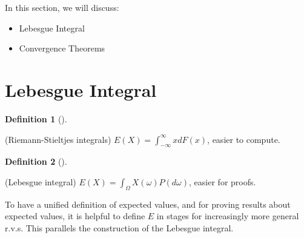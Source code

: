 \documentclass[
  letterpaper,
  DIV=11,
  numbers=noendperiod]{scrreprt}
\providecommand{\tightlist}{%
  \setlength{\itemsep}{0pt}\setlength{\parskip}{0pt}}\usepackage{longtable,booktabs,array}
\theoremstyle{definition}
\newtheorem{definition}{Definition}[chapter]
\theoremstyle{plain}
\theoremstyle{remark}
\begin{document}

In this section, we will discuss:

\begin{itemize}
\tightlist
\item
  Lebesgue Integral
\item
  Convergence Theorems
\end{itemize}

\hypertarget{lebesgue-integral}{%
\section*{Lebesgue Integral}\label{lebesgue-integral}}


\leavevmode{}%
\begin{definition}[]\label{def-Riemann-Stieltjes-integral}

(Riemann-Stieltjes integrals)
\(E(X) = \int_{-\infty}^{\infty} x dF(x)\), easier to compute.

\end{definition}

\leavevmode{}%
\begin{definition}[]\label{def-Lebesgue-integral}

(Lebesgue integral) \(E(X) = \int_{\Omega} X(\omega) P(d\omega)\),
easier for proofs.

\end{definition}

To have a unified definition of expected values, and for proving results
about expected values, it is helpful to define \(E\) in stages for
increasingly more general r.v.s. This parallels the construction of the
Lebesgue integral.
\end{document}
